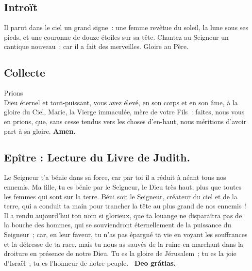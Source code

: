 


\begin{multicols}{2}
\subsection*{Introït}
Il parut dans le ciel un grand signe : une femme revêtue du soleil, la lune sous ses pieds, et une couronne de douze étoiles sur sa tête.
Chantez au Seigneur un cantique nouveau : car il a fait des merveilles.
\vb\ Gloire au Père.

\subsection*{Collecte}
Prions\\
Dieu éternel et tout-puissant, vous avez élevé, en son corps et en son âme, à la gloire du Ciel, Marie, la Vierge immaculée, mère de votre Fils : faites, nous vous en prions, que, sans cesse tendus vers les choses d’en-haut, nous méritions d’avoir part à sa gloire.
{\textbf {\rb\ Amen.}}

\subsection*{Epître : Lecture du Livre de Judith.}
Le Seigneur t’a bénie dans sa force, car par toi il a réduit à néant tous nos ennemis. Ma fille, tu es bénie par le Seigneur, le Dieu très haut, plus que toutes les femmes qui sont sur la terre. Béni soit le Seigneur, créateur du ciel et de la terre, qui a conduit ta main pour trancher la tête au plus grand de nos ennemis ! Il a rendu aujourd’hui ton nom si glorieux, que ta louange ne disparaîtra pas de la bouche des hommes, qui se souviendront éternellement de la puissance du Seigneur ; car, en leur faveur, tu n’as pas épargné ta vie en voyant les souffrances et la détresse de ta race, mais tu nous as sauvés de la ruine en marchant dans la droiture en présence de notre Dieu. Tu es la gloire de Jérusalem ; tu es la joie d’Israël ; tu es l’honneur de notre peuple.
\textbf{\rb\ Deo grátias.}


\end{multicols}

